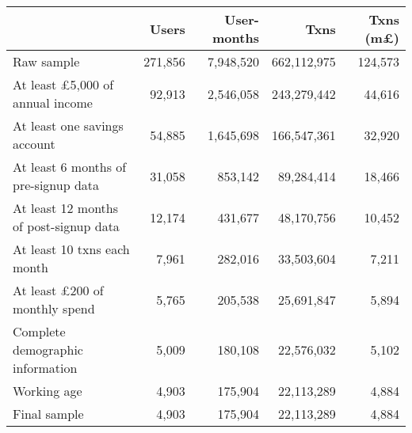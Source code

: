 \begin{tabular}{lrrrr}
\toprule
                                       &   Users & User-months &        Txns & Txns (m\pounds) \\
\midrule
                            Raw sample & 271,856 &   7,948,520 & 662,112,975 &         124,573 \\
At least \pounds5,000 of annual income &  92,913 &   2,546,058 & 243,279,442 &          44,616 \\
          At least one savings account &  54,885 &   1,645,698 & 166,547,361 &          32,920 \\
  At least 6 months of pre-signup data &  31,058 &     853,142 &  89,284,414 &          18,466 \\
At least 12 months of post-signup data &  12,174 &     431,677 &  48,170,756 &          10,452 \\
           At least 10 txns each month &   7,961 &     282,016 &  33,503,604 &           7,211 \\
  At least \pounds200 of monthly spend &   5,765 &     205,538 &  25,691,847 &           5,894 \\
      Complete demographic information &   5,009 &     180,108 &  22,576,032 &           5,102 \\
                           Working age &   4,903 &     175,904 &  22,113,289 &           4,884 \\
                          Final sample &   4,903 &     175,904 &  22,113,289 &           4,884 \\
\bottomrule
\end{tabular}
